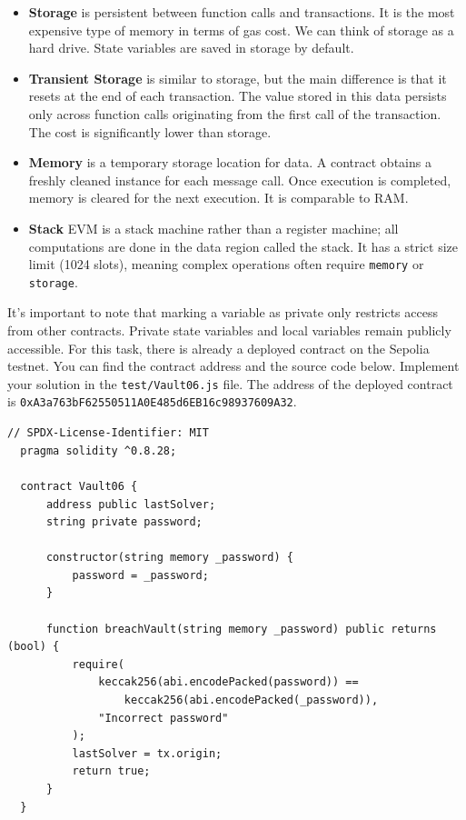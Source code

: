 \documentclass[12pt]{article}
\begin{document}
\begin{itemize}
\item \textbf{Storage} is persistent between function calls and transactions. It is the most expensive type of memory in terms of gas cost. We can think of storage as a hard drive. State variables are saved in storage by default.

\item \textbf{Transient Storage} is similar to storage, but the main difference is that it resets at the end of each transaction. The value stored in this data persists only across function calls originating from the first call of the transaction. The cost is significantly lower than storage.

\item \textbf{Memory} is a temporary storage location for data. A contract obtains a freshly cleaned instance for each message call. Once execution is completed, memory is cleared for the next execution. It is comparable to RAM.

\item \textbf{Stack} EVM is a stack machine rather than a register machine; all computations are done in the data region called the stack. It has a strict size limit (1024 slots), meaning complex operations often require \texttt{memory} or \texttt{storage}.

\end{itemize}

\noindent
It's important to note that marking a variable as private only restricts access from other contracts. Private state variables and local variables remain publicly accessible. For this task, there is already a deployed contract on the Sepolia testnet. You can find the contract address and the source code below. Implement your solution in the \texttt{test/Vault06.js} file. The address of the deployed contract is \texttt{0xA3a763bF62550511A0E485d6EB16c98937609A32}.

\begin{lstlisting}[language=Solidity]
  // SPDX-License-Identifier: MIT
  pragma solidity ^0.8.28;
  
  contract Vault06 {
      address public lastSolver;
      string private password;
  
      constructor(string memory _password) {
          password = _password;
      }
  
      function breachVault(string memory _password) public returns (bool) {
          require(
              keccak256(abi.encodePacked(password)) ==
                  keccak256(abi.encodePacked(_password)),
              "Incorrect password"
          );
          lastSolver = tx.origin;
          return true;
      }
  }
\end{lstlisting}
\end{document}
